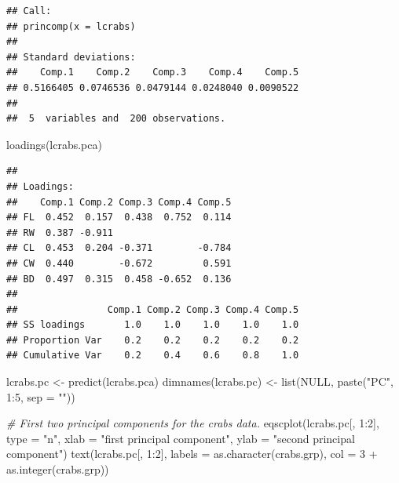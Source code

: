\documentclass[
]{article}
\newenvironment{Shaded}{\begin{snugshade}}{\end{snugshade}}
\newcommand{\AttributeTok}[1]{\textcolor[rgb]{0.77,0.63,0.00}{#1}}
\newcommand{\CommentTok}[1]{\textcolor[rgb]{0.56,0.35,0.01}{\textit{#1}}}
\newcommand{\ConstantTok}[1]{\textcolor[rgb]{0.00,0.00,0.00}{#1}}
\newcommand{\DecValTok}[1]{\textcolor[rgb]{0.00,0.00,0.81}{#1}}
\newcommand{\FunctionTok}[1]{\textcolor[rgb]{0.00,0.00,0.00}{#1}}
\newcommand{\NormalTok}[1]{#1}
\newcommand{\OtherTok}[1]{\textcolor[rgb]{0.56,0.35,0.01}{#1}}
\newcommand{\SpecialCharTok}[1]{\textcolor[rgb]{0.00,0.00,0.00}{#1}}
\newcommand{\StringTok}[1]{\textcolor[rgb]{0.31,0.60,0.02}{#1}}
\begin{document}
\begin{verbatim}
## Call:
## princomp(x = lcrabs)
## 
## Standard deviations:
##    Comp.1    Comp.2    Comp.3    Comp.4    Comp.5 
## 0.5166405 0.0746536 0.0479144 0.0248040 0.0090522 
## 
##  5  variables and  200 observations.
\end{verbatim}

\begin{Shaded}
\begin{Highlighting}[]
\FunctionTok{loadings}\NormalTok{(lcrabs.pca)}
\end{Highlighting}
\end{Shaded}

\begin{verbatim}
## 
## Loadings:
##    Comp.1 Comp.2 Comp.3 Comp.4 Comp.5
## FL  0.452  0.157  0.438  0.752  0.114
## RW  0.387 -0.911                     
## CL  0.453  0.204 -0.371        -0.784
## CW  0.440        -0.672         0.591
## BD  0.497  0.315  0.458 -0.652  0.136
## 
##                Comp.1 Comp.2 Comp.3 Comp.4 Comp.5
## SS loadings       1.0    1.0    1.0    1.0    1.0
## Proportion Var    0.2    0.2    0.2    0.2    0.2
## Cumulative Var    0.2    0.4    0.6    0.8    1.0
\end{verbatim}

\begin{Shaded}
\begin{Highlighting}[]
\NormalTok{lcrabs.pc }\OtherTok{\textless{}{-}} \FunctionTok{predict}\NormalTok{(lcrabs.pca)}
\FunctionTok{dimnames}\NormalTok{(lcrabs.pc) }\OtherTok{\textless{}{-}} \FunctionTok{list}\NormalTok{(}\ConstantTok{NULL}\NormalTok{, }\FunctionTok{paste}\NormalTok{(}\StringTok{"PC"}\NormalTok{, }\DecValTok{1}\SpecialCharTok{:}\DecValTok{5}\NormalTok{, }\AttributeTok{sep =} \StringTok{""}\NormalTok{))}
\end{Highlighting}
\end{Shaded}

\begin{Shaded}
\begin{Highlighting}[]
\CommentTok{\# First two principal components for the crabs data.}
\FunctionTok{eqscplot}\NormalTok{(lcrabs.pc[, }\DecValTok{1}\SpecialCharTok{:}\DecValTok{2}\NormalTok{], }\AttributeTok{type =} \StringTok{"n"}\NormalTok{,}
         \AttributeTok{xlab =} \StringTok{"first principal component"}\NormalTok{,}
         \AttributeTok{ylab =} \StringTok{"second principal component"}\NormalTok{)}
\FunctionTok{text}\NormalTok{(lcrabs.pc[, }\DecValTok{1}\SpecialCharTok{:}\DecValTok{2}\NormalTok{], }\AttributeTok{labels =} \FunctionTok{as.character}\NormalTok{(crabs.grp),}
     \AttributeTok{col =} \DecValTok{3} \SpecialCharTok{+} \FunctionTok{as.integer}\NormalTok{(crabs.grp)) }
\end{Highlighting}
\end{Shaded}
\end{document}
